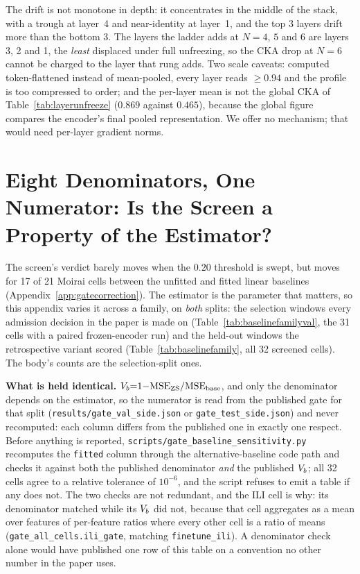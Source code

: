 \noindent The drift is not monotone in depth: it concentrates in the middle of the
stack, with a trough at layer~4 and near-identity at layer~1, and the top 3 layers
drift more than the bottom 3.  The layers the ladder adds at $N{=}4$, $5$ and $6$
are layers 3, 2 and 1, the \emph{least} displaced under full unfreezing, so the
CKA drop at $N{=}6$ cannot be charged to the layer that rung adds.  Two scale
caveats: computed token-flattened instead of mean-pooled, every layer reads
${\geq}0.94$ and the profile is too compressed to order; and the per-layer mean is
not the global CKA of Table~\ref{tab:layerunfreeze} ($0.869$ against $0.465$),
because the global figure compares the encoder's final pooled representation.  We
offer no mechanism; that would need per-layer gradient norms.

\section{Eight Denominators, One Numerator: Is the Screen a Property of the Estimator?}
\label{app:baselines}

The screen's verdict barely moves when the $0.20$ threshold is swept, but moves
for 17 of 21 Moirai cells between the unfitted and fitted linear baselines
(Appendix~\ref{app:gatecorrection}).  The estimator is the parameter that
matters, so this appendix varies it across a family, on \emph{both} splits: the selection windows every
admission decision in the paper is made on (Table~\ref{tab:baselinefamilyval}, the
31 cells with a paired frozen-encoder run) and the held-out windows the
retrospective variant scored (Table~\ref{tab:baselinefamily}, all 32 screened
cells).  The body's counts are the selection-split ones.

\textbf{What is held identical.}  $V_{b}{=}1{-}\text{MSE}_\text{ZS} /
\text{MSE}_\text{base}$, and only the denominator depends on the estimator, so
the numerator is read from the published gate for that split
(\texttt{results/gate\_val\_side.json} or \texttt{gate\_test\_side.json}) and never
recomputed: each column differs from the published one in exactly one respect.
Before anything is reported, \texttt{scripts/gate\_baseline\_sensitivity.py}
recomputes the \texttt{fitted} column through the alternative-baseline code path
and checks it against both the published denominator \emph{and} the published
$V_{b}$; all 32 cells agree to a relative tolerance of $10^{-6}$, and
the script refuses to emit a table if any does not.  The two checks are not
redundant, and the ILI cell is why: its denominator matched while its
$V_{b}$ did not, because that cell aggregates as a mean over features
of per-feature ratios where every other cell is a ratio of means
(\texttt{gate\_all\_cells.ili\_gate}, matching \texttt{finetune\_ili}).  A
denominator check alone would have published one row of this table on a
convention no other number in the paper uses.

